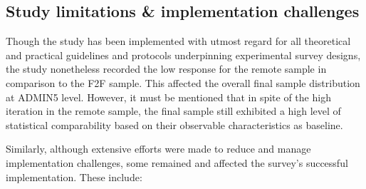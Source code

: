 \documentclass[11pt,harvard]{article}
\begin{document}
	
	
	   
	\pagebreak
	
	
	\subsection{Study limitations \& implementation challenges}
	
	Though the study has been implemented with utmost regard for all theoretical and practical guidelines and protocols underpinning experimental survey designs, the study nonetheless recorded the low response for the remote sample in comparison to the F2F sample. This affected the overall final sample distribution at ADMIN5 level. However, it must be mentioned that in spite of the high iteration in the remote sample, the final sample still exhibited a high level of statistical comparability based on their observable characteristics as baseline.
	
	
	Similarly, although extensive efforts were made to reduce and manage implementation challenges, some remained and affected the survey's successful implementation. These include:
	
\end{document}
